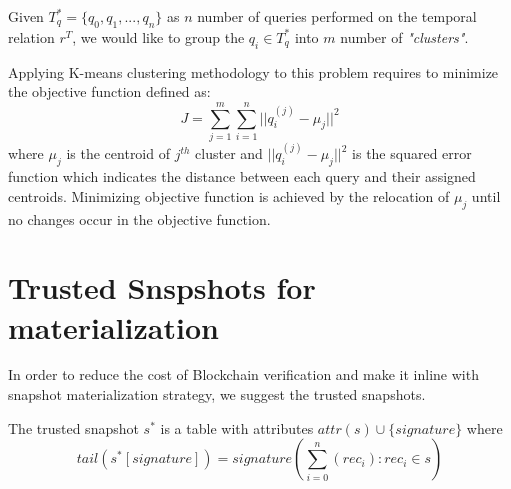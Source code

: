 			\begin{prop} 
				Given $T_q^* = \{q_0,q_1,...,q_n\}$ as $n$ number of queries performed on the temporal relation $r^T$, we would like to group the $q_i \in T_q^*$ into $m$ number of \textit{"clusters"}. 
			\label{prop:heuristic_method}
			\end{prop}

			Applying K-means clustering methodology to this problem requires to minimize the objective function defined as:
			$$J = \sum_{j=1}^{m} \sum_{i=1}^{n} ||q_i^{(j)}-\mu_j||^2$$
			where $\mu_j$ is the centroid of $j^{th}$ cluster and $||q_i^{(j)}-\mu_j||^2$ is the squared error function which indicates the distance between each query and their assigned centroids.
			Minimizing objective function is achieved by the relocation of $\mu_j$ until no changes occur in the objective function.



	
		\section{Trusted Snspshots for materialization} \label{sec:trusted_snapshots}
			In order to reduce the cost of Blockchain verification and make it inline with snapshot materialization strategy, we suggest the trusted snapshots.

			\begin{defn} 
				The trusted snapshot $s^*$ is a table with attributes $attr(s)\cup \{signature\}$ where $$tail(s^*[signature]) = signature(\sum_{i=0}^n (rec_i):rec_i \in s)$$
			\label{defn:trusted_snapshot}
			\end{defn}

